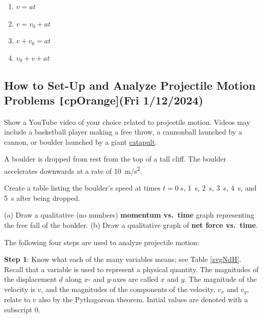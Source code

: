 \documentclass[main-physics.tex]{subfiles}
\begin{document}
\begin{enumerate}[label=\Alph*.]
    \item $v = at$
    \item $v = v_0 + a t$
    \item $v + v_0 = at$
    \item $v_0 + v + at$
\end{enumerate} 

\subsection{How to Set-Up and Analyze Projectile Motion Problems \texttt[cpOrange]{(Fri 1/12/2024)}} \label{Qxc2Cv}

\begin{hook}
    Show a YouTube video of your choice related to projectile motion. Videos may include a basketball player making a free throw, a cannonball launched by a cannon, or boulder launched by a giant \href{https://youtu.be/xgm9EzdCZXI}{catapult}. 
\end{hook}

\begin{warmup}
    A boulder is dropped from rest from the top of a tall cliff. The boulder accelerates downwards at a rate of \SI{10}{m/s^2}.

    \begin{exercise} \label{MbIMKN}
        Create a table listing the boulder's speed at times $t = \SI{0}{s}$, \SI{1}{s}, \SI{2}{s}, \SI{3}{s}, \SI{4}{s}, and \SI{5}{s} after being dropped.
    \end{exercise}

    \begin{exercise} \label{ObtV91}
        (a) Draw a qualitative (no numbers) \textbf{momentum vs.~time} graph representing the free fall of the boulder. (b) Draw a qualitative graph of \textbf{net force vs.~time}.
    \end{exercise}
\end{warmup}


The following four steps are used to analyze projectile motion:

\vspace{1em}

\textbf{Step 1}: Know what each of the many variables means; see Table \ref{zvgNdH}. Recall that a variable is used to represent a physical quantity. The magnitudes of the displacement $d$ along $x$- and $y$-axes are called $x$ and  $y$. The magnitude of the velocity is $v$, and the magnitudes of the components of the velocity, $v_x$ and $v_y$, relate to $v$ also by the Pythagorean theorem. Initial values are denoted with a subscript 0.
\end{document}
